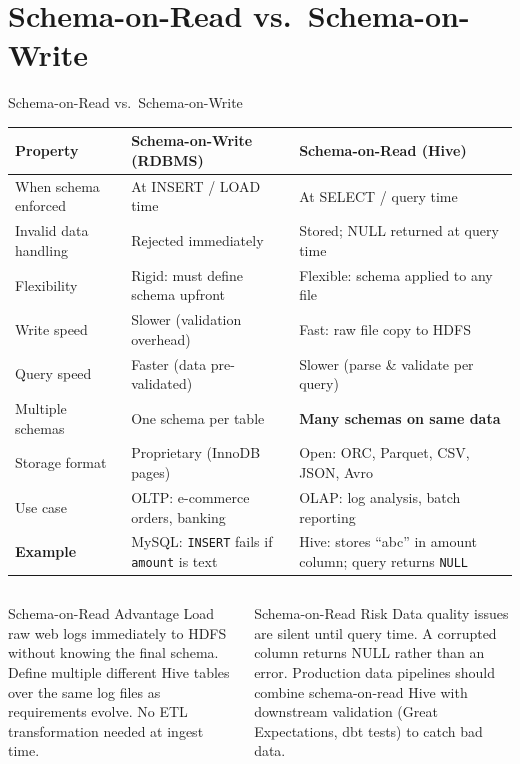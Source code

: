 \documentclass[aspectratio=169,10pt]{beamer}
\begin{document}
\section{Schema-on-Read vs.\ Schema-on-Write}

\begin{frame}{Schema-on-Read vs.\ Schema-on-Write}
  \begin{center}
  \renewcommand{\arraystretch}{1.5}
  \begin{tabular}{p{3.0cm}p{4.8cm}p{4.8cm}}
    \toprule
    \textbf{Property}     & \textbf{Schema-on-Write (RDBMS)} & \textbf{Schema-on-Read (Hive)} \\
    \midrule
    When schema enforced  & At INSERT / LOAD time             & At SELECT / query time \\
    Invalid data handling & \alert{Rejected immediately}       & Stored; NULL returned at query time \\
    Flexibility           & Rigid: must define schema upfront  & Flexible: schema applied to any file \\
    Write speed           & Slower (validation overhead)       & Fast: raw file copy to HDFS \\
    Query speed           & Faster (data pre-validated)        & Slower (parse \& validate per query) \\
    Multiple schemas      & One schema per table               & \textbf{Many schemas on same data} \\
    Storage format        & Proprietary (InnoDB pages)         & Open: ORC, Parquet, CSV, JSON, Avro \\
    Use case              & OLTP: e-commerce orders, banking   & OLAP: log analysis, batch reporting \\
    \midrule
    \textbf{Example}      & MySQL: \texttt{INSERT} fails if \texttt{amount} is text & Hive: stores ``abc'' in amount column; query returns \texttt{NULL} \\
    \bottomrule
  \end{tabular}
  \end{center}
  \vspace{4pt}
  \begin{columns}[T]
      \begin{block}{Schema-on-Read Advantage}
        \small Load raw web logs immediately to HDFS without knowing the final schema.  Define multiple different Hive tables over the same log files as requirements evolve.  No ETL transformation needed at ingest time.
      \end{block}
      \begin{alertblock}{Schema-on-Read Risk}
        \small Data quality issues are silent until query time.  A corrupted column returns NULL rather than an error.  Production data pipelines should combine schema-on-read Hive with downstream validation (Great Expectations, dbt tests) to catch bad data.
      \end{alertblock}
  \end{columns}
\end{frame}
\end{document}
